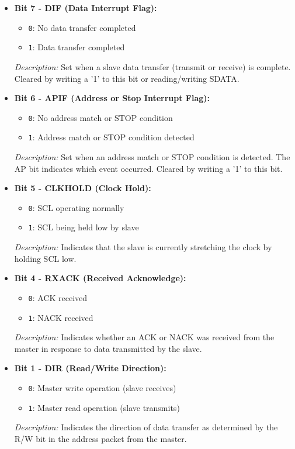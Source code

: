 \begin{itemize}
    \item \textbf{Bit 7 - DIF (Data Interrupt Flag):} 
    \begin{itemize}
        \item \texttt{0}: No data transfer completed
        \item \texttt{1}: Data transfer completed
    \end{itemize}
    \textit{Description:} Set when a slave data transfer (transmit or receive) is complete. Cleared by writing a '1' to this bit or reading/writing SDATA.
    
    \item \textbf{Bit 6 - APIF (Address or Stop Interrupt Flag):} 
    \begin{itemize}
        \item \texttt{0}: No address match or STOP condition
        \item \texttt{1}: Address match or STOP condition detected
    \end{itemize}
    \textit{Description:} Set when an address match or STOP condition is detected. The AP bit indicates which event occurred. Cleared by writing a '1' to this bit.
    
    \item \textbf{Bit 5 - CLKHOLD (Clock Hold):} 
    \begin{itemize}
        \item \texttt{0}: SCL operating normally
        \item \texttt{1}: SCL being held low by slave
    \end{itemize}
    \textit{Description:} Indicates that the slave is currently stretching the clock by holding SCL low.
    
    \item \textbf{Bit 4 - RXACK (Received Acknowledge):} 
    \begin{itemize}
        \item \texttt{0}: ACK received
        \item \texttt{1}: NACK received
    \end{itemize}
    \textit{Description:} Indicates whether an ACK or NACK was received from the master in response to data transmitted by the slave.
    
    \item \textbf{Bit 1 - DIR (Read/Write Direction):} 
    \begin{itemize}
        \item \texttt{0}: Master write operation (slave receives)
        \item \texttt{1}: Master read operation (slave transmits)
    \end{itemize}
    \textit{Description:} Indicates the direction of data transfer as determined by the R/W bit in the address packet from the master.
    

\end{itemize}
